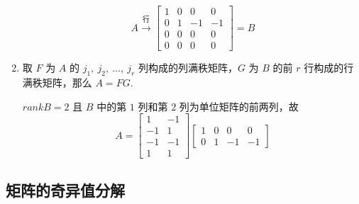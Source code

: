 \begin{solution}
\begin{enumerate}
\begin{equation*}
                            A \stackrel{\text{行}}{\longrightarrow} \begin{bmatrix}
                                1 & 0 & 0 & 0 \\ 0 & 1 & -1 & -1 \\ 0 & 0 & 0 & 0 \\ 0 & 0 & 0 & 0
                            \end{bmatrix} = B
                        \end{equation*}
                    \item 取 $F$ 为 $A$ 的 $j_1, \ j_2, \ \dots, \ j_r$ 列构成的列满秩矩阵，$G$ 为 $B$ 的前 $r$ 行构成的行满秩矩阵，那么 $A = FG$.
                        \par $rankB = 2$ 且 $B$ 中的第 $1$ 列和第 $2$ 列为单位矩阵的前两列，故
                        \begin{equation*}
                            A = \begin{bmatrix}
                                1 & -1 \\ -1 & 1 \\ -1 & -1 \\ 1 & 1
                            \end{bmatrix}\begin{bmatrix}
                                1 & 0 & 0 & 0 \\ 0 & 1 & -1 & -1
                            \end{bmatrix}
                        \end{equation*}
                \end{enumerate}
            \end{solution}


    \subsection{矩阵的奇异值分解}
